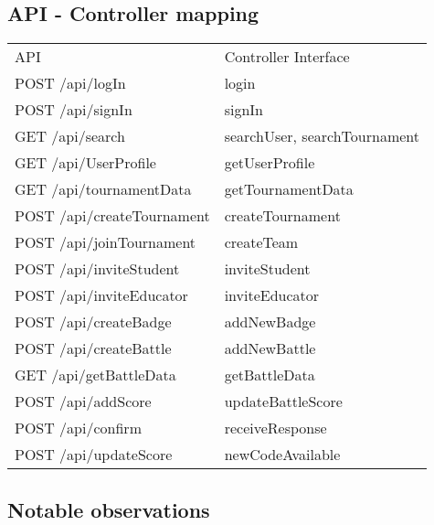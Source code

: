 \subsection{API - Controller mapping} \label{reff:apimap}
\begin{center}
    \begin{tabu}{|X[.5]|X[.5]|} \hline \everyrow{\hline}
        API & Controller Interface \\
        POST /api/logIn & login\\
        POST /api/signIn & signIn\\
        GET /api/search & searchUser, searchTournament\\
        GET /api/UserProfile & getUserProfile\\
        GET /api/tournamentData & getTournamentData\\
        POST /api/createTournament & createTournament\\
        POST /api/joinTournament & createTeam\\
        POST /api/inviteStudent & inviteStudent\\
        POST /api/inviteEducator & inviteEducator\\
        POST /api/createBadge & addNewBadge\\
        POST /api/createBattle & addNewBattle\\
        GET /api/getBattleData & getBattleData\\
        POST /api/addScore & updateBattleScore\\
        POST /api/confirm & receiveResponse\\
        POST /api/updateScore & newCodeAvailable\\
    \end{tabu}
\end{center}

\subsection{Notable observations}
